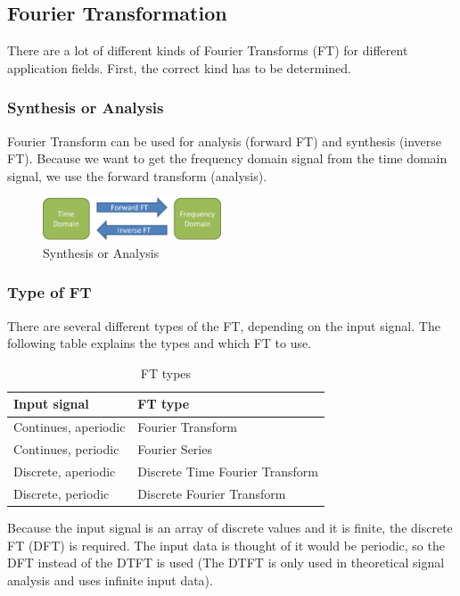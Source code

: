 \documentclass[notitlepage]{scrreprt}
\begin{document}
\subsection{Fourier Transformation}
There are a lot of different kinds of Fourier Transforms (FT) for different application fields. First, the correct kind has to be determined.

\subsubsection{Synthesis or Analysis}
Fourier Transform can be used for analysis (forward FT) and synthesis (inverse FT). Because we want to get the frequency domain signal from the time domain signal, we use the forward transform (analysis).

\begin{figure}[H]
	\centering
	\includegraphics[width=200px]{images/DFT_types1.png}
	\caption{Synthesis or Analysis}
	\label{fig:dft-types1}
\end{figure}

\newpage

\subsubsection{Type of FT}
There are several different types of the FT, depending on the input signal. The following table explains the types and which FT to use.

\begin{table}[h]
\centering
\begin{tabular}{|l|l|}
	\hline
	\textbf{Input signal} & \textbf{FT type} \\ \hline
	Continues, aperiodic & Fourier Transform \\ \hline
	Continues, periodic & Fourier Series \\ \hline
	Discrete, aperiodic & Discrete Time Fourier Transform \\ \hline
	Discrete, periodic & Discrete Fourier Transform \\ \hline
\end{tabular}
\caption{FT types}
\end{table}

Because the input signal is an array of discrete values and it is finite, the discrete FT (DFT) is required. The input data is thought of it would be periodic, so the DFT instead of the DTFT is used (The DTFT is only used in theoretical signal analysis and uses infinite input data).
\end{document}
